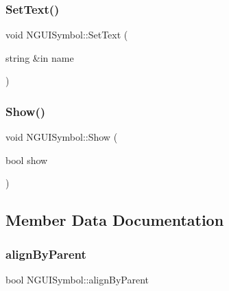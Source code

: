 \hypertarget{class_n_g_u_i_symbol_aa35f638beeabbdffe3288e8d1e221990}{}\label{class_n_g_u_i_symbol_aa35f638beeabbdffe3288e8d1e221990} 
\subsubsection{\texorpdfstring{Set\+Text()}{SetText()}}
{\footnotesize\ttfamily void N\+G\+U\+I\+Symbol\+::\+Set\+Text (\begin{DoxyParamCaption}\item[{string \&in}]{name }\end{DoxyParamCaption})}

\hypertarget{class_n_g_u_i_symbol_af90d22478ab79660913920e3dc08a73f}{}\label{class_n_g_u_i_symbol_af90d22478ab79660913920e3dc08a73f} 
\subsubsection{\texorpdfstring{Show()}{Show()}}
{\footnotesize\ttfamily void N\+G\+U\+I\+Symbol\+::\+Show (\begin{DoxyParamCaption}\item[{bool}]{show }\end{DoxyParamCaption})}



\subsection{Member Data Documentation}
\hypertarget{class_n_g_u_i_symbol_af923443db5fa7cd94113a2cc30ffeae3}{}\label{class_n_g_u_i_symbol_af923443db5fa7cd94113a2cc30ffeae3} 
\subsubsection{\texorpdfstring{align\+By\+Parent}{alignByParent}}
{\footnotesize\ttfamily bool N\+G\+U\+I\+Symbol\+::align\+By\+Parent}

\hypertarget{class_n_g_u_i_symbol_abe3a4c161f3376e42fcbcde784dd172e}{}\label{class_n_g_u_i_symbol_abe3a4c161f3376e42fcbcde784dd172e} 
